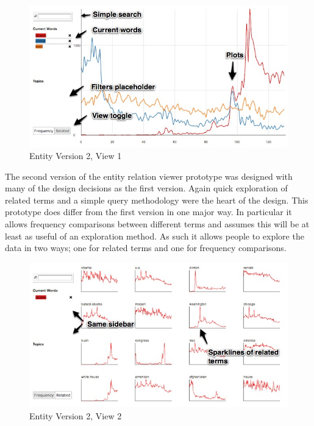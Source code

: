 \begin{figure}[htb]
  \centerline{
    \includegraphics[scale=0.37]{figures/relation-1-a.jpg}
  }
  \caption{Entity Version 2, View 1}
  \label{fig:explorer-1-a}
\end{figure}

The second version of the entity relation viewer prototype was designed with many of the design decisions as the first version. Again quick exploration of related terms and a simple query  methodology were the heart of the design. This prototype does differ from the first version in one major way. In particular it allows frequency comparisons between different terms and assumes this will be at least as useful of an exploration method. As such it allows people to explore the data in two ways; one for related terms and one for frequency comparisons.


\begin{figure}[htb]
  \centerline{
    \includegraphics[scale=0.37]{figures/relation-1-b.jpg}
  }
  \caption{Entity Version 2, View 2}
  \label{fig:explorer-1-b}
\end{figure}
